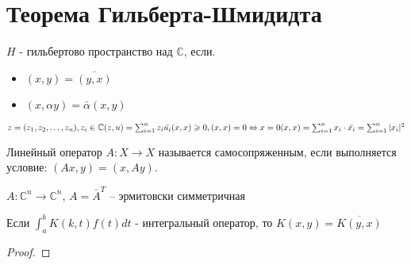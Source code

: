 \section{Теорема Гильберта-Шмидидта}
\begin{definition}
    $H$ - гильбертово пространство над $\mathbb{C}$, если.
    \begin{itemize}
        \item $(x, y) = \overline{(y, x)}$
        \item $(x,\alpha y) = \bar{\alpha}(x, y)$
    \end{itemize}
\end{definition}

\begin{example}
    $z = (z_1, z_2, \dotsc, z_n), z_i \in \mathbb{C} \\
    (z, u) = \sum_{i = 1} ^n z_i \bar{u_i} \\
    (x, x) \geqslant 0, (x, x) = 0 \Leftrightarrow x = 0 \\
    (x, x) = \sum_{i = 1} ^n x_i \cdot \bar{x_i} = \sum_{i = 1} ^n |x_i|^2$
\end{example}

\begin{definition}
    Линейный оператор $A: X \rightarrow X$ называется самосопряженным, 
    если выполняется условие:
    $(Ax, y) = (x, Ay)$.
\end{definition}

\begin{example}
    $A : \mathbb{C}^n \rightarrow \mathbb{C}^n$, 
    $A = \bar{A}^T$ -- эрмитовски симметричная
\end{example}

\begin{statement}
    Если  $\int_a ^b K(k, t) f(t) dt$ - интегральный оператор, 
    то $K(x, y) = \overline{K(y, x)}$
\end{statement}
\begin{proof}
\end{proof}

